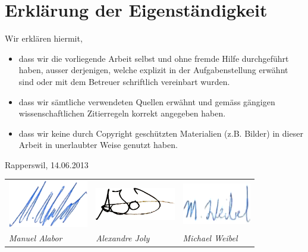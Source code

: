 \chapter*{Erklärung der Eigenständigkeit}

Wir erklären hiermit,

\begin{itemize}
	\item dass wir die vorliegende Arbeit selbst und ohne fremde Hilfe durchgeführt haben, ausser derjenigen, welche explizit in der Aufgabenstellung erwähnt sind oder mit dem Betreuer schriftlich vereinbart wurden.
	\item dass wir sämtliche verwendeten Quellen erwähnt und gemäss gängigen wissenschaftlichen Zitierregeln korrekt angegeben haben.
	\item dass wir keine durch Copyright geschützten Materialien (z.B. Bilder) in dieser Arbeit in unerlaubter Weise genutzt haben.
\end{itemize}

\vspace*{50mm}

Rapperswil, 14.06.2013

\vspace*{3cm}

\begin{table}[H]
\begin{tabularx}{\textwidth}{X X X}
	\includegraphics[width=3.5cm]{content/images/signature-mal.png} &
	\centering\includegraphics[width=3.5cm]{content/images/signature-ajo.png} &
	\hfill\includegraphics[width=3cm]{content/images/signature-mwe.png}

	\tabularnewline

	\sffamily\textit{Manuel Alabor} &
	\centering\sffamily\textit{Alexandre Joly} &
	\hfill\sffamily\textit{Michael Weibel}
	\tabularnewline
\end{tabularx}
\end{table}